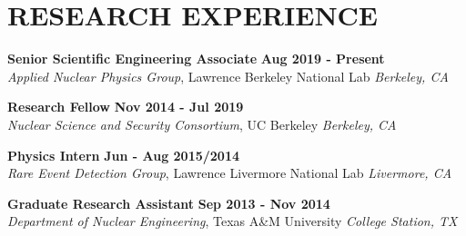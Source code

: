 \section{\small{RESEARCH EXPERIENCE}}

\textbf{Senior Scientific Engineering Associate} \hfill \textbf{Aug 2019 - Present} \\
\textsl{Applied Nuclear Physics Group}, Lawrence Berkeley National Lab \hfill \textsl{Berkeley, CA} \\[-2.8ex]
\vspace{-5pt}

\textbf{Research Fellow} \hfill \textbf{Nov 2014 - Jul 2019} \\
\textsl{Nuclear Science and Security Consortium}, UC Berkeley \hfill \textsl{Berkeley, CA} \\[-2.8ex]
\vspace{-5pt}

\textbf{Physics Intern} \hfill \textbf{Jun - Aug 2015/2014} \\
\textsl{Rare Event Detection Group}, Lawrence Livermore National Lab \hfill \textsl{Livermore, CA} \\[-2.8ex]
\vspace{-5pt}

\textbf{Graduate Research Assistant} \hfill \textbf{Sep 2013 - Nov 2014} \\
\textsl{Department of Nuclear Engineering}, Texas A\&M University \hfill \textsl{College Station, TX} \\[-2.8ex]
